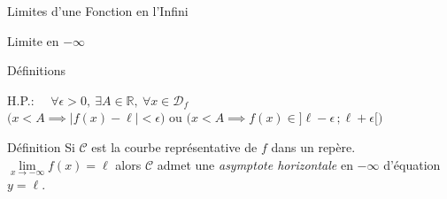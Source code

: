 \documentclass{cours}
\begin{document}
\begin{Gpartie}{Limites d'une Fonction en l'Infini}
\begin{Spartie}{Limite en $-\infty$}
\begin{SSpartie}{Définitions}
\begin{itemize}
\begin{center}
                        \parbox{\linewidth}{}
                    \end{center}
                    \vspace*{2ex}
                    H.P.: $\quad\forall\epsilon >0,~\exists A\in\mathbb{R},~\forall x\in\mathcal{D}_f$ \\ \phantom{H.P.: \quad}$\bigg(x<A\implies\left\lvert f(x)-\ell\right\rvert <\epsilon\bigg)$ ou $\bigg(x<A\implies f(x)\in\big]\ell-\epsilon\,;\ell+\epsilon\big[\bigg)$
                \end{itemize}
            \end{SSpartie}
            \begin{SSpartie}{Définition} 
                Si $\mathcal{C}$ est la courbe représentative de $f$ dans un repère. $\lim\limits_{x\to-\infty}f(x)=\ell$ alors $\mathcal{C}$ admet une \emph{asymptote horizontale} en $-\infty$ d'équation $y=\ell$.
            \end{SSpartie}
        \end{Spartie}
    \end{Gpartie}
    \pagebreak
\end{document}
